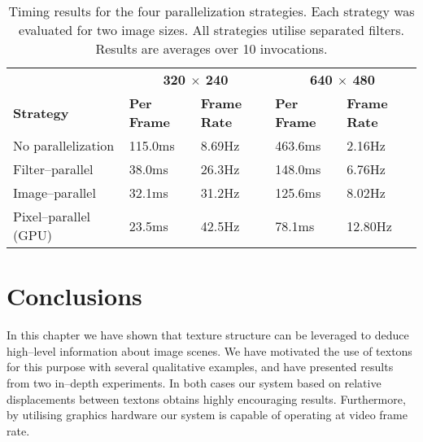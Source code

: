 \begin{table}[htp]
  \centering
  \begin{tabular}{@{}p{40mm}p{20mm}p{20mm}p{20mm}p{20mm}@{}}
    \toprule
      & \multicolumn{2}{c}{\textbf{320 $\times$ 240}}
      & \multicolumn{2}{c}{\textbf{640 $\times$ 480}} \\
      \textbf{Strategy} &
      \textbf{Per Frame} &
      \textbf{Frame Rate} &
      \textbf{Per Frame} &
      \textbf{Frame Rate} \\
    \midrule
      No parallelization & 115.0ms & 8.69Hz & 463.6ms & 2.16Hz \\
      Filter--parallel & 38.0ms & 26.3Hz & 148.0ms & 6.76Hz \\
      Image--parallel & 32.1ms & 31.2Hz & 125.6ms & 8.02Hz \\
      Pixel--parallel (GPU) & 23.5ms & 42.5Hz & 78.1ms & 12.80Hz \\
    \bottomrule
  \end{tabular}
  \caption{Timing results for the four parallelization strategies. Each
    strategy was evaluated for two image sizes. All strategies utilise
    separated filters. Results are averages over 10 invocations.}
  \label{table:convolve-timing}
\end{table}

\section{Conclusions}
In this chapter we have shown that texture structure can be leveraged
to deduce high--level information about image scenes. We have
motivated the use of textons for this purpose with several qualitative
examples, and have presented results from two in--depth
experiments. In both cases our system based on relative displacements
between textons obtains highly encouraging results. Furthermore, by
utilising graphics hardware our system is capable of operating at
video frame rate.


